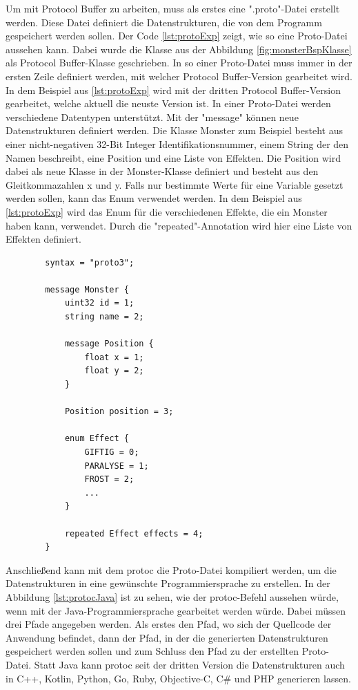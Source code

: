 Um mit Protocol Buffer zu arbeiten, muss als erstes eine ".proto"-Datei erstellt werden. Diese Datei definiert die Datenstrukturen, die von dem Programm gespeichert werden sollen. Der Code \ref{lst:protoExp} zeigt, wie so eine Proto-Datei aussehen kann. Dabei wurde die Klasse aus der Abbildung \ref{fig:monsterBspKlasse} als Protocol Buffer-Klasse geschrieben. In so einer Proto-Datei muss immer in der ersten Zeile definiert werden, mit welcher Protocol Buffer-Version gearbeitet wird. In dem Beispiel aus \ref{lst:protoExp} wird mit der dritten Protocol Buffer-Version gearbeitet, welche aktuell die neuste Version ist. In einer Proto-Datei werden verschiedene Datentypen unterstützt. Mit der "message" können neue Datenstrukturen definiert werden. Die Klasse Monster zum Beispiel besteht aus einer nicht-negativen 32-Bit Integer Identifikationsnummer, einem String der den Namen beschreibt, eine Position und eine Liste von Effekten. Die Position wird dabei als neue Klasse in der Monster-Klasse definiert und besteht aus den Gleitkommazahlen x und y. Falls nur bestimmte Werte für eine Variable gesetzt werden sollen, kann das Enum verwendet werden. In dem Beispiel aus \ref{lst:protoExp} wird das Enum für die verschiedenen Effekte, die ein Monster haben kann, verwendet. Durch die "repeated"-Annotation wird hier eine Liste von Effekten definiert.\cite{protobufLanguageGuide}\cite{protobufProtocolBufferJava}

\begin{listing}[htp]
    \begin{verbatim} 
        syntax = "proto3";
        
        message Monster {
            uint32 id = 1;
            string name = 2;

            message Position {
                float x = 1;
                float y = 2;
            }

            Position position = 3;

            enum Effect {
                GIFTIG = 0;
                PARALYSE = 1;
                FROST = 2;
                ...
            }

            repeated Effect effects = 4;
        }
    \end{verbatim}
    \caption{Proto-Datei einer Monster-Klasse}
    \label{lst:protoExp}
\end{listing}

Anschließend kann mit dem \ac{protoc} die Proto-Datei kompiliert werden, um die Datenstrukturen in eine gewünschte Programmiersprache zu erstellen. In der Abbildung \ref{lst:protocJava} ist zu sehen, wie der \ac{protoc}-Befehl aussehen würde, wenn mit der Java-Programmiersprache gearbeitet werden würde. Dabei müssen drei Pfade angegeben werden. Als erstes den Pfad, wo sich der Quellcode der Anwendung befindet, dann der Pfad, in der die generierten Datenstrukturen gespeichert werden sollen und zum Schluss den Pfad zu der erstellten Proto-Datei. Statt Java kann \ac{protoc} seit der dritten Version die Datenstrukturen auch in C++, Kotlin, Python, Go, Ruby, Objective-C, C\# und PHP generieren lassen.\cite{protobufLanguageGuide}\cite{protobufProtocolBufferJava}

